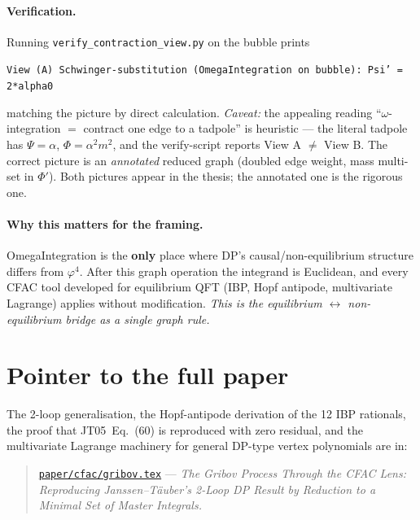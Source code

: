 \documentclass[11pt,a4paper]{article}
\begin{document}
\paragraph{Verification.} Running \texttt{verify\_contraction\_view.py} on the bubble
prints
\begin{center}\small
\texttt{View (A) Schwinger-substitution (OmegaIntegration on bubble): Psi' = 2*alpha0}
\end{center}
matching the picture by direct calculation. \emph{Caveat:} the appealing reading
``$\omega$-integration $=$ contract one edge to a tadpole'' is heuristic --- the literal
tadpole has $\Psi = \alpha$, $\Phi = \alpha^{2}m^{2}$, and the verify-script reports
View A $\ne$ View B. The correct picture is an \emph{annotated} reduced graph (doubled
edge weight, mass multi-set in $\Phi'$). Both pictures appear in the thesis; the
annotated one is the rigorous one.

\paragraph{Why this matters for the framing.} OmegaIntegration is the \textbf{only} place
where DP's causal/non-equilibrium structure differs from $\varphi^{4}$. After this graph
operation the integrand is Euclidean, and every CFAC tool developed for equilibrium QFT
(IBP, Hopf antipode, multivariate Lagrange) applies without modification. \emph{This is
the equilibrium $\leftrightarrow$ non-equilibrium bridge as a single graph rule.}

\section{Pointer to the full paper}

The 2-loop generalisation, the Hopf-antipode derivation of the 12 IBP rationals, the
proof that JT05~Eq.~(60) is reproduced with zero residual, and the multivariate Lagrange
machinery for general DP-type vertex polynomials are in:
\begin{quote}
\href{../../paper/cfac/gribov.tex}{\texttt{paper/cfac/gribov.tex}} ---
\textit{The Gribov Process Through the CFAC Lens: Reproducing Janssen--T\"auber's 2-Loop
DP Result by Reduction to a Minimal Set of Master Integrals.}
\end{quote}
\end{document}
